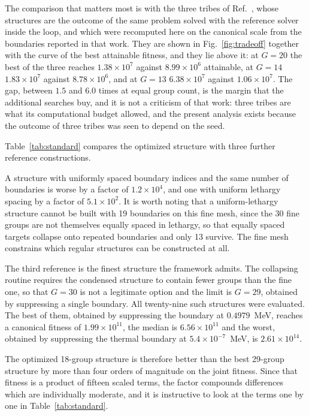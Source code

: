 \documentclass{style/nseJournal}
\begin{document}
The comparison that matters most is with the three tribes of
Ref.~\cite{prevMulti}, whose structures are the outcome of the same problem
solved with the reference solver inside the loop, and which were recomputed here
on the canonical scale from the boundaries reported in that work. They are shown in
Fig.~\ref{fig:tradeoff} together with the curve of the best attainable fitness,
and they lie above it: at $G=20$ the best of the three reaches
$1.38\times10^{7}$ against $8.99\times10^{6}$ attainable, at $G=14$
$1.83\times10^{7}$ against $8.78\times10^{6}$, and at $G=13$ $6.38\times10^{7}$
against $1.06\times10^{7}$. The gap, between $1.5$ and $6.0$ times at equal
group count, is the margin that the additional searches buy, and it is not a
criticism of that work: three tribes are what its computational budget allowed,
and the present analysis exists because the outcome of three tribes was seen to
depend on the seed.

Table~\ref{tab:standard} compares the optimized structure with three further
reference constructions.

A structure with uniformly spaced boundary indices and the same number of
boundaries is worse by a factor of $1.2\times10^{4}$, and one with uniform
lethargy spacing by a factor of $5.1\times10^{2}$. It is worth noting that a
uniform-lethargy structure cannot be built with 19 boundaries on this fine mesh,
since the 30 fine groups are not themselves equally spaced in lethargy, so that
equally spaced targets collapse onto repeated boundaries and only 13 survive.
The fine mesh constrains which regular structures can be constructed at all.



The third reference is the finest structure the framework admits. The collapsing
routine requires the condensed structure to contain fewer groups than the fine
one, so that $G=30$ is not a legitimate option and the limit is $G=29$, obtained
by suppressing a single boundary. All twenty-nine such structures were
evaluated. The best of them, obtained by suppressing the boundary at
$0.4979$~MeV, reaches a canonical fitness of $1.99\times10^{11}$, the median is
$6.56\times10^{11}$ and the worst, obtained by suppressing the thermal boundary
at $5.4\times10^{-7}$~MeV, is $2.61\times10^{14}$.

The optimized 18-group structure is therefore better than the best 29-group
structure by more than four orders of magnitude on the joint fitness. Since that
fitness is a product of fifteen scaled terms, the factor compounds differences
which are individually moderate, and it is instructive to look at the terms one
by one in Table~\ref{tab:standard}.
\end{document}
